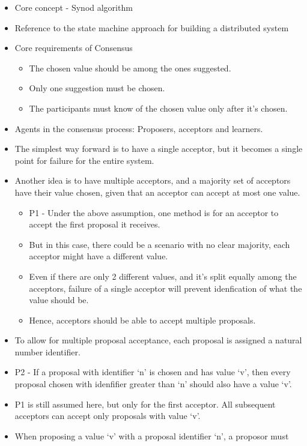 \documentclass[a4paper]{article}
\begin{document}
\begin{itemize}
\item
    Core concept - Synod algorithm
\item
    Reference to the state machine approach for building a distributed
    system
\item
    Core requirements of Consensus

    \begin{itemize}
        \item
        The chosen value should be among the ones suggested.
    \item
        Only one suggestion must be chosen.
    \item
        The participants must know of the chosen value only after it's
        chosen.
    \end{itemize}
\item
    Agents in the consensus process: Proposers, acceptors and learners.
\item
    The simplest way forward is to have a single acceptor, but it becomes
    a single point for failure for the entire system.
\item
    Another idea is to have multiple acceptors, and a majority set of
    acceptors have their value chosen, given that an acceptor can accept
    at most one value.

    \begin{itemize}
        \item
        P1 - Under the above assumption, one method is for an acceptor to
        accept the first proposal it receives.
    \item
        But in this case, there could be a scenario with no clear majority,
        each acceptor might have a different value.
    \item
        Even if there are only 2 different values, and it's split equally
        among the acceptors, failure of a single acceptor will prevent
        idenfication of what the value should be.
    \item
        Hence, acceptors should be able to accept multiple proposals.
    \end{itemize}
\item
    To allow for multiple proposal acceptance, each proposal is assigned a
    natural number identifier.
\item
    P2 - If a proposal with identifier `n' is chosen and has value `v',
    then every proposal chosen with idenfifier greater than `n' should
    also have a value `v'.
\item
    P1 is still assumed here, but only for the first acceptor. All
    subsequent acceptors can accept only proposals with value `v'.
\item
    When proposing a value `v' with a proposal identifier `n', a proposor
    must


\end{itemize}
\end{document}
